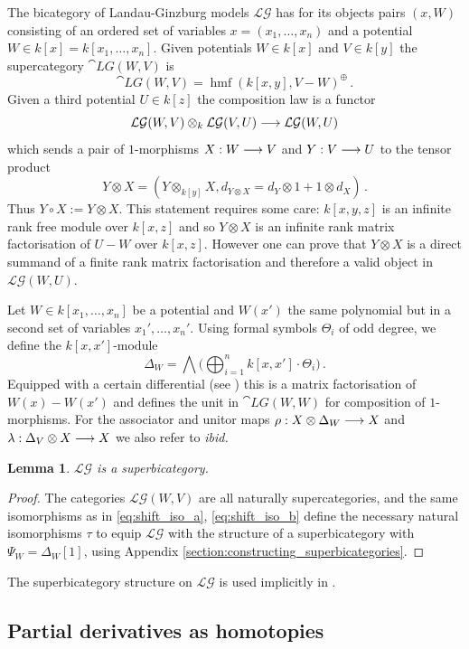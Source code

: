 \documentclass[english,letter paper,12pt,leqno]{article}
\newtheorem{lemma}[theorem]{Lemma}
\theoremstyle{example}
\numberwithin{equation}{section}
\def\LG{\mathcal{LG}}
\DeclareMathOperator{\hmf}{hmf}
\begin{document}
The bicategory of Landau-Ginzburg models $\LG$ has for its objects pairs $(x,W)$ consisting of an ordered set of variables $x = (x_1,\ldots,x_n)$ and a potential $W \in k[x] = k[x_1,\ldots,x_n]$. Given potentials $W \in k[x]$ and $V \in k[y]$ the supercategory $\cat{LG}(W,V)$ is
\[
\cat{LG}(W,V) = \hmf(k[x,y], V - W)^{\oplus}\,.
\]
Given a third potential $U \in k[z]$ the composition law is a functor
\[
\LG(W,V) \otimes_k \LG(V, U) \lto \LG(W, U)
\]
which sends a pair of $1$-morphisms $X: W \longrightarrow V$ and $Y: V \longrightarrow U$ to the tensor product
\begin{equation}\label{eq:tensor_comp}
Y \otimes X = ( Y \otimes_{k[y]} X, d_{Y \otimes X} = d_Y \otimes 1 + 1 \otimes d_X )\,.
\end{equation}
Thus $Y \circ X := Y \otimes X$. This statement requires some care: $k[x,y,z]$ is an infinite rank free module over $k[x,z]$ and so $Y \otimes X$ is an infinite rank matrix factorisation of $U - W$ over $k[x,z]$. However one can prove that $Y \otimes X$ is a direct summand of a finite rank matrix factorisation \cite{dm1102.2957} and therefore a valid object in $\LG(W,U)$.

Let $W \in k[x_1,\ldots,x_n]$ be a potential and $W(x')$ the same polynomial but in a second set of variables $x_1',\ldots,x_n'$. Using formal symbols $\Theta_i$ of odd degree, we define the $k[x,x']$-module
\[
\Delta_W = \bigwedge \big( \bigoplus_{i=1}^n k[x,x'] \cdot \Theta_i \big)\,.
\]
Equipped with a certain differential (see \cite{lgdual}) this is a matrix factorisation of $W(x) - W(x')$ and defines the unit in $\cat{LG}(W,W)$ for composition of $1$-morphisms. For the associator and unitor maps $\rho: X \otimes \Delta_W \longrightarrow X$ and $\lambda: \Delta_V \otimes X \longrightarrow X$ we also refer to \emph{ibid.}

\begin{lemma} $\LG$ is a superbicategory.
\end{lemma}
\begin{proof}
The categories $\LG(W,V)$ are all naturally supercategories, and the same isomorphisms as in \eqref{eq:shift_iso_a}, \eqref{eq:shift_iso_b} define the necessary natural isomorphisms $\tau$ to equip $\LG$ with the structure of a superbicategory with $\Psi_W = \Delta_W[1]$, using Appendix \ref{section:constructing_superbicategories}.
\end{proof}

The superbicategory structure on $\LG$ is used implicitly in \cite[Section 7]{lgdual}.

\subsection{Partial derivatives as homotopies}\label{section:partial}
\end{document}
